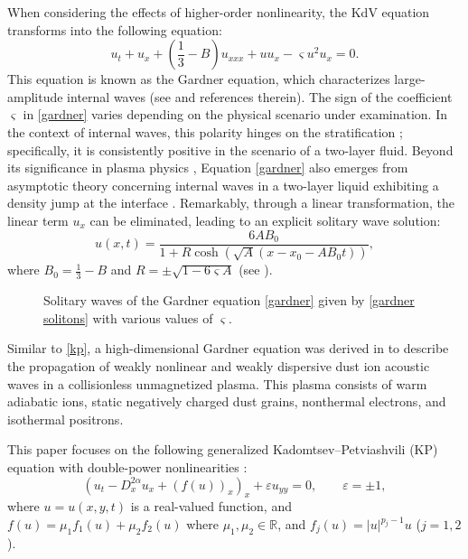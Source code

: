 \documentclass[10pt]{article}
\numberwithin{equation}{section}
\newcommand{\e}{\varepsilon}
\newcommand{\mo}{\mu_1}  \newcommand{\po}{{p_1}}
\newcommand{\moo}{\mu_2}  \newcommand{\poo}{{p_2}}
\newcommand{\al}{\alpha}
\newcommand{\rr}{\mathbb{R}}
\begin{document}
	
	When considering the effects of higher-order nonlinearity, the KdV equation transforms into the following equation:
	\begin{equation}\label{gardner}
		u_t + u_x + \left(\frac{1}{3} - B\right)u_{xxx} + uu_x - \varsigma u^2u_x = 0.
	\end{equation}
	This equation is known as the Gardner equation, which characterizes large-amplitude internal waves (see \cite{grimshaw} and references therein). The sign of the coefficient $\varsigma$ in \eqref{gardner} varies depending on the physical scenario under examination. In the context of internal waves, this polarity hinges on the stratification \cite{grimshaw}; specifically, it is consistently positive in the scenario of a two-layer fluid. Beyond its significance in plasma physics \cite{rtp, watanabe}, Equation \eqref{gardner} also emerges from asymptotic theory concerning internal waves in a two-layer liquid exhibiting a density jump at the interface \cite{ky, miles}. Remarkably, through a linear transformation, the linear term $u_x$ can be eliminated, leading to an explicit solitary wave solution:
	\begin{equation}\label{gardner solitons}
		u(x, t) = \frac{6AB_0}{1 + R\cosh\left(\sqrt{A}(x - x_0 - AB_0t)\right)},
	\end{equation}
	where $B_0 = \frac{1}{3} - B$ and $R = \pm\sqrt{1 - 6\varsigma A}$ (see \cite{gpps}).
	
	\begin{figure}[ht]
		\begin{center}
			\caption{Solitary waves of the Gardner equation \eqref{gardner} given by \eqref{gardner solitons} with various values of $\varsigma$. }\label{gard}
	\end{center}\end{figure}
	
	Similar to \eqref{kp}, a high-dimensional Gardner equation was derived in \cite{osb} to describe the propagation of weakly nonlinear and weakly dispersive dust ion acoustic waves in a collisionless unmagnetized plasma. This plasma consists of warm adiabatic ions, static negatively charged dust grains, nonthermal electrons, and isothermal positrons.
	
	This paper focuses on the following generalized Kadomtsev–Petviashvili (KP) equation with double-power nonlinearities \cite{osb,sbd,skt}:
	\begin{equation}\label{main-fifthkp}
		\left(u_t-D_x^{2\al} u_x+(f(u))_x\right)_x+ \e u_{yy}=0, \qquad \e=\pm1,
	\end{equation}
	where $u=u(x,y,t)$ is a real-valued function, and $f(u)=\mo f_1(u)+\moo f_2(u)$ where $\mo,\moo\in\rr$, and $f_j(u)=|u|^{p_j-1}u$ ($j=1,2$).
	
\end{document}
